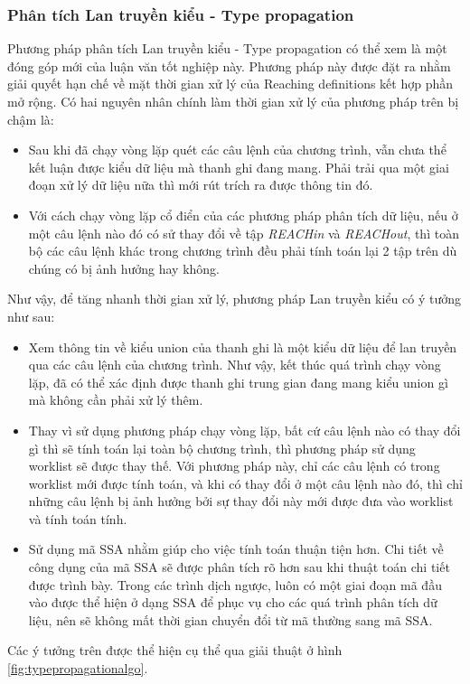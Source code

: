 \subsubsection{Phân tích Lan truyền kiểu - Type propagation}
Phương pháp phân tích Lan truyền kiểu - Type propagation có thể xem là một đóng góp mới của luận văn tốt nghiệp này. Phương pháp này được đặt ra nhằm giải quyết hạn chế về mặt thời gian xử lý của Reaching definitions kết hợp phần mở rộng. Có hai nguyên nhân chính làm thời gian xử lý của phương pháp trên bị chậm là:
\begin{itemize}
	\item Sau khi đã chạy vòng lặp quét các câu lệnh của chương trình, vẫn chưa thể kết luận được kiểu dữ liệu mà thanh ghi đang mang. Phải trải qua một giai đoạn xử lý dữ liệu nữa thì mới rút trích ra được thông tin đó.
	\item Với cách chạy vòng lặp cổ điển của các phương pháp phân tích dữ liệu, nếu ở một câu lệnh nào đó có sử thay đổi về tập \textit{REACHin} và \textit{REACHout}, thì toàn bộ các câu lệnh khác trong chương trình đều phải tính toán lại 2 tập trên dù chúng có bị ảnh hưởng hay không.
\end{itemize}
Như vậy, để tăng nhanh thời gian xử lý, phương pháp Lan truyền kiểu có ý tưởng như sau:
\begin{itemize}
	\item Xem thông tin về kiểu union của thanh ghi là một kiểu dữ liệu để lan truyền qua các câu lệnh của chương trình. Như vậy, kết thúc quá trình chạy vòng lặp, đã có thể xác định được thanh ghi trung gian đang mang kiểu union gì mà không cần phải xử lý thêm.
	\item Thay vì sử dụng phương pháp chạy vòng lặp, bất cứ câu lệnh nào có thay đổi gì thì sẽ tính toán lại toàn bộ chương trình, thì phương pháp sử dụng worklist sẽ được thay thế. Với phương pháp này, chỉ các câu lệnh có trong worklist mới được tính toán, và khi có thay đổi ở một câu lệnh nào đó, thì chỉ những câu lệnh bị ảnh hưởng bởi sự thay đổi này mới được đưa vào worklist và tính toán tính.
	\item Sử dụng mã SSA nhằm giúp cho việc tính toán thuận tiện hơn. Chi tiết về công dụng của mã SSA sẽ được phân tích rõ hơn sau khi thuật toán chi tiết được trình bày. Trong các trình dịch ngược, luôn có một giai đoạn mã đầu vào được thể hiện ở dạng SSA để phục vụ cho các quá trình phân tích dữ liệu, nên sẽ không mất thời gian chuyển đổi từ mã thường sang mã SSA.
\end{itemize}
Các ý tưởng trên được thể hiện cụ thể qua giải thuật ở hình \ref{fig:typepropagationalgo}.\\

